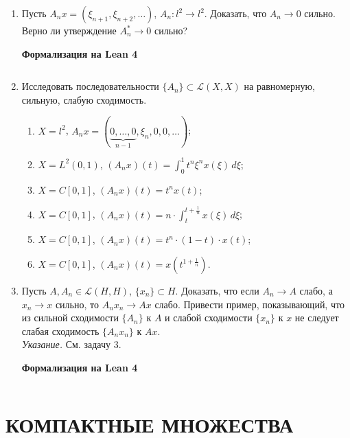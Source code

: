\documentclass[12pt,a4paper]{article}
\begin{document}
\begin{enumerate}
\newpage
\item Пусть $A_{n}x = (\xi_{n+1}, \xi_{n+2}, \dots)$, $A_{n}: l^{2} \rightarrow l^{2}$. Доказать, что $A_{n} \rightarrow 0$ сильно. Верно ли утверждение $A_{n}^{*} \rightarrow 0$ сильно?


\begin{center}\small\textbf{Формализация на Lean 4}\end{center}
\inputminted{lean}{FunAn/Section19_OperatorConvergence/Task04.lean}

\newpage

\item Исследовать последовательности $\{A_{n}\} \subset \mathcal{L}(X,X)$ на равномерную, сильную, слабую сходимость.
\begin{enumerate}[label=\alph*)]
\item $X = l^{2}$, $A_{n}x = (\underbrace{0, \dots, 0}_{n-1}, \xi_{n}, 0, 0, \dots)$;
\item $X = L^{2}(0,1)$, $(A_{n}x)(t) = \int_{0}^{1} t^{n}\xi^{n}x(\xi) \, d\xi$;
\item $X = C[0,1]$, $(A_{n}x)(t) = t^{n}x(t)$;
\item $X = C[0,1]$, $(A_{n}x)(t) = n \cdot \int_{t}^{t+\frac{1}{n}} x(\xi) \, d\xi$;
\item $X = C[0,1]$, $(A_{n}x)(t) = t^{n} \cdot (1-t) \cdot x(t)$;
\item $X = C[0,1]$, $(A_{n}x)(t) = x(t^{1+\frac{1}{n}})$.
\end{enumerate}

\newpage
\item Пусть $A, A_{n} \in \mathcal{L}(H,H)$, $\{x_{n}\} \subset H$. Доказать, что если $A_{n} \rightarrow A$ слабо, а $x_{n} \rightarrow x$ сильно, то $A_{n}x_{n} \rightarrow Ax$ слабо. Привести пример, показывающий, что из сильной сходимости $\{A_{n}\}$ к $A$ и слабой сходимости $\{x_{n}\}$ к $x$ не следует слабая сходимость $\{A_{n}x_{n}\}$ к $Ax$.\\
\textit{Указание.} См. задачу 3.

\begin{center}\small\textbf{Формализация на Lean 4}\end{center}
\inputminted{lean}{FunAn/Section19_OperatorConvergence/Task06.lean}

\end{enumerate}

\section{КОМПАКТНЫЕ МНОЖЕСТВА}
\end{document}
